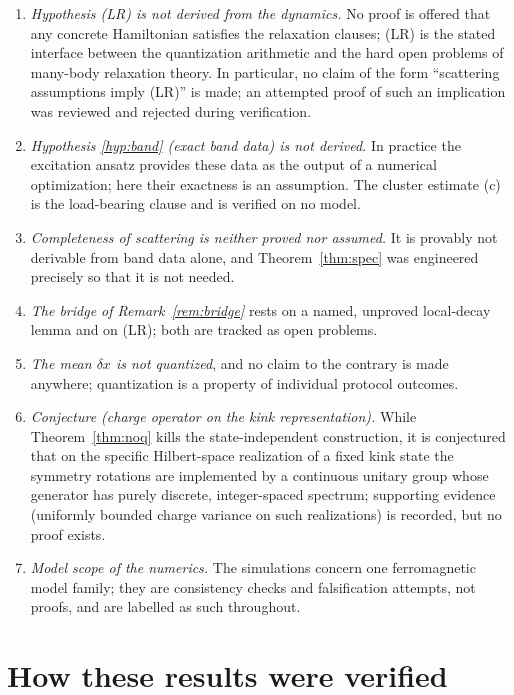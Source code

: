 \documentclass[11pt]{article}
\theoremstyle{definition}
\theoremstyle{remark}
\begin{document}
\begin{enumerate}
\item \emph{Hypothesis (LR) is not derived from the dynamics.}  No proof is
offered that any concrete Hamiltonian satisfies the relaxation clauses; (LR)
is the stated interface between the quantization arithmetic and the hard
open problems of many-body relaxation theory.  In particular, no claim of
the form ``scattering assumptions imply (LR)'' is made; an attempted proof
of such an implication was reviewed and rejected during verification.
\item \emph{Hypothesis \ref{hyp:band} (exact band data) is not derived.}
In practice the excitation ansatz provides these data as the output of a
numerical optimization; here their exactness is an assumption.  The cluster estimate (c) is the
load-bearing clause and is verified on no model.
\item \emph{Completeness of scattering is neither proved nor assumed.}  It
is provably not derivable from band data alone, and Theorem~\ref{thm:spec}
was engineered precisely so that it is not needed.
\item \emph{The bridge of Remark~\ref{rem:bridge}} rests on a named,
unproved local-decay lemma and on (LR); both are tracked as open problems.
\item \emph{The mean $\delta x$ is not quantized}, and no claim to the
contrary is made anywhere; quantization is a property of individual
protocol outcomes.
\item \emph{Conjecture (charge operator on the kink representation).}  While
Theorem~\ref{thm:noq} kills the state-independent construction, it is
conjectured that on the specific Hilbert-space realization of a fixed kink
state the symmetry rotations are implemented by a continuous unitary group
whose generator has purely discrete, integer-spaced spectrum; supporting
evidence (uniformly bounded charge variance on such realizations) is
recorded, but no proof exists.
\item \emph{Model scope of the numerics.}  The simulations concern one
ferromagnetic model family; they are consistency checks and falsification
attempts, not proofs, and are labelled as such throughout.
\end{enumerate}

\appendix

\section{How these results were verified}\label{app:method}
\end{document}
